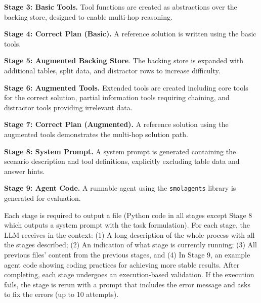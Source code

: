 \documentclass[11pt]{article}
\begin{document}
\noindent \textbf{Stage 3: Basic Tools.}
Tool functions are created as abstractions over the backing store, designed to enable multi-hop reasoning.

\noindent \textbf{Stage 4: Correct Plan (Basic).}
A reference solution is written using the basic tools.

\noindent \textbf{Stage 5: Augmented Backing Store}.
The backing store is expanded with additional tables, split data, and distractor rows to increase difficulty.

\noindent \textbf{Stage 6: Augmented Tools.}
Extended tools are created including core tools for the correct solution, partial information tools requiring chaining, and distractor tools providing irrelevant data.


\noindent \textbf{Stage 7: Correct Plan (Augmented).}
A reference solution using the augmented tools demonstrates the multi-hop solution path.

\noindent \textbf{Stage 8: System Prompt.}
A system prompt is generated containing the scenario description and tool definitions, explicitly excluding table data and answer hints.

\noindent \textbf{Stage 9: Agent Code.}
A runnable agent using the \texttt{smolagents} \citep{roucher2025smolagents} library is generated for evaluation.

Each stage is required to output a file (Python code in all stages except Stage 8 which outputs a system prompt with the task formulation). For each stage, the LLM receives in the context:
(1) A long description of the whole process with all the stages described; (2) An indication of what stage is currently running; (3) All previous files' content from the previous stages, and (4) In Stage 9, an example agent code showing coding practices for achieving more stable results.
After completing, each stage undergoes an execution-based validation. If the execution fails, the stage is rerun with a prompt that includes the error message and asks to fix the errors (up to 10 attempts).
\end{document}
